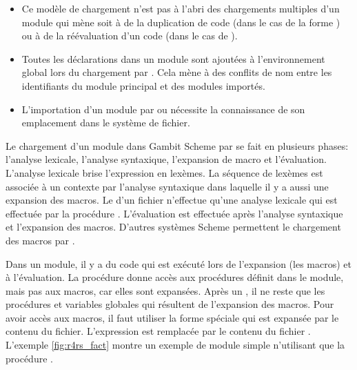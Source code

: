 \begin{itemize}
  \item Ce modèle de chargement n'est pas à l'abri des chargements multiples
    d'un module qui mène soit à de la duplication de code (dans le cas de la forme )
    ou à de la réévaluation d'un code (dans le cas de ).

  \item Toutes les déclarations dans un module sont ajoutées à l'environnement
    global lors du chargement par . Cela mène à des conflits de
    nom entre les identifiants du module principal et des modules importés.

  \item L'importation d'un module par  ou  nécessite la connaissance
    de son emplacement dans le système de fichier.

\end{itemize}


Le chargement d'un module dans Gambit Scheme par  se fait en plusieurs
phases: l'analyse lexicale, l'analyse syntaxique, l'expansion de macro et
l'évaluation. L'analyse lexicale brise l'expression en lexèmes. La séquence de
lexèmes est associée à un contexte par l'analyse syntaxique dans laquelle il y a aussi
une expansion des macros. Le  d'un fichier n'effectue qu'une
analyse lexicale qui est effectuée par la procédure . L'évaluation
est effectuée après l'analyse syntaxique et l'expansion des macros. D'autres systèmes
Scheme permettent le chargement des macros par .

Dans un module, il y a du code qui est exécuté lors de l'expansion (les macros)
et à l'évaluation. La procédure  donne accès aux procédures définit
dans le module, mais pas aux macros, car elles sont expansées.  Après un
, il ne reste que les procédures et variables globales qui
résultent de l'expansion des macros.  Pour avoir accès aux macros, il faut
utiliser la forme spéciale  qui est expansée par le contenu du
fichier.  L'expression  est remplacée par le
contenu du fichier . L'exemple \ref{fig:r4rs_fact} montre un
exemple de module simple n'utilisant que la procédure .

